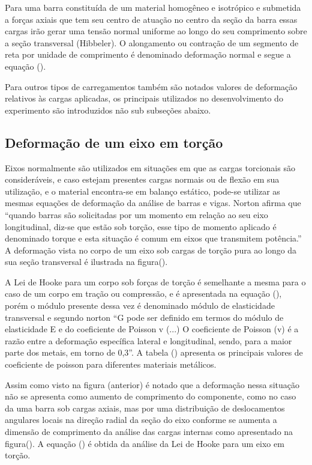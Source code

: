 Para uma barra constituída de um material homogêneo e isotrópico e submetida a forças axiais que tem seu centro de atuação no centro da seção da barra essas cargas irão gerar uma tensão normal uniforme ao longo do seu comprimento sobre a seção transversal (Hibbeler). O alongamento ou contração de um segmento de reta por unidade de comprimento é denominado deformação normal e segue a equação ().

Para outros tipos de carregamentos também são notados valores de deformação relativos às cargas aplicadas, os principais utilizados no desenvolvimento do experimento são introduzidos não sub subseções abaixo.

\subsection{Deformação de um eixo em torção}

Eixos normalmente são utilizados em situações em que as cargas torcionais são consideráveis, e caso estejam presentes cargas normais ou de flexão em sua utilização, e o material encontra-se em balanço estático, pode-se utilizar as mesmas equações de deformação da análise de barras e vigas. Norton afirma que “quando barras são solicitadas por um momento em relação ao seu eixo longitudinal, diz-se que estão sob torção, esse tipo de momento aplicado é denominado torque e esta situação é comum em eixos que transmitem potência.” A deformação vista no corpo de um eixo sob cargas de torção pura ao longo da sua seção transversal é ilustrada na figura().

A Lei de Hooke para um corpo sob forças de torção é semelhante a mesma para o caso de um corpo em tração ou compressão, e é apresentada na equação (), porém o módulo presente dessa vez é denominado módulo de elasticidade transversal e segundo norton “G pode ser definido em termos do módulo de elasticidade E e do coeficiente de Poisson v (...) O coeficiente de Poisson (v) é a razão entre a deformação específica lateral e longitudinal, sendo, para a maior parte dos metais, em torno de 0,3”. A tabela () apresenta os principais valores de coeficiente de poisson para diferentes materiais metálicos.

Assim como visto na figura (anterior) é notado que a deformação nessa situação não se apresenta como aumento de comprimento do componente, como no caso da uma barra sob cargas axiais, mas por uma distribuição de deslocamentos angulares locais na direção radial da seção do eixo conforme se aumenta a dimensão de comprimento da análise das cargas internas como apresentado na figura(). A equação () é obtida da análise da Lei de Hooke para um eixo em torção.

